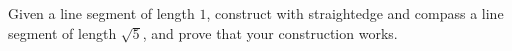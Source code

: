 Given a line segment of length $1$, construct with straightedge and compass a line segment of length $\sqrt5$, and prove that your construction works.
